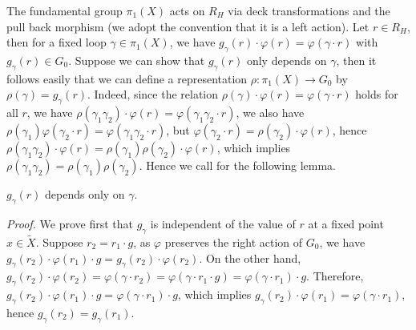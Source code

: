 \documentclass[aspectratio=169, 10pt]{beamer}
\theoremstyle{definition}
\theoremstyle{example}
\begin{document}
	\begin{frame}[allowframebreaks]
		The fundamental group $\pi_1(X)$ acts on $R_H$ via deck transformations and the pull back morphism (we adopt the convention that it is a left action). Let $r\in R_H$, then for a fixed loop $\gamma\in \pi_1(X)$, we have $g_\gamma(r)\cdot \varphi(r)=\varphi(\gamma\cdot r)$ with $g_\gamma(r)\in G_0$. Suppose we can show that $g_\gamma(r)$ only depends on $\gamma$, then it follows easily that we can define a representation $\rho: \pi_1(X)\to G_0$ by $\rho(\gamma)=g_\gamma(r)$. Indeed, since the relation $\rho(\gamma)\cdot \varphi(r)=\varphi(\gamma\cdot r)$ holds for all $r$, we have $\rho(\gamma_1\gamma_2)\cdot \varphi(r)=\varphi(\gamma_1\gamma_2\cdot r)$, we also have $\rho(\gamma_1)\varphi(\gamma_2\cdot r)=\varphi(\gamma_1\gamma_2\cdot r)$, but $\varphi(\gamma_2\cdot r)=\rho(\gamma_2)\cdot \varphi(r)$, hence $\rho(\gamma_1\gamma_2)\cdot \varphi(r)=\rho(\gamma_1)\rho(\gamma_2)\cdot \varphi(r)$, which implies $\rho(\gamma_1\gamma_2)=\rho(\gamma_1)\rho(\gamma_2)$. Hence we call for the following lemma.
		\begin{lemma}
			$g_\gamma(r)$ depends only on $\gamma$.
		\end{lemma}
		\noindent \textit{Proof.} 
			We prove first that $g_\gamma$ is independent of the value of $r$ at a fixed point $x\in \widetilde{X}$. Suppose $r_{2}=r_1\cdot g$, as $\varphi$ preserves the right action of $G_0$, we have $g_\gamma(r_2)\cdot\varphi(r_1)\cdot g=g_\gamma(r_2)\cdot\varphi(r_2)$. On the other hand, $g_\gamma(r_2)\cdot\varphi(r_2)=\varphi(\gamma\cdot r_2)=\varphi(\gamma\cdot r_1\cdot g)=\varphi(\gamma\cdot r_1)\cdot g$. Therefore, $g_\gamma(r_2)\cdot\varphi(r_1)\cdot g=\varphi(\gamma\cdot r_1)\cdot g$, which implies $g_\gamma(r_2)\cdot\varphi(r_1)=\varphi(\gamma\cdot r_1)$, hence $g_\gamma(r_2)=g_\gamma(r_1)$.
			

\end{frame}
\end{document}

